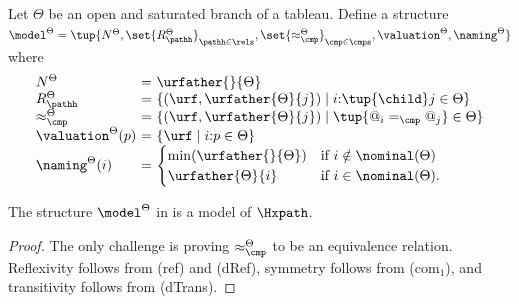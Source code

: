 \begin{defi}\label{def:extmodel}
    Let $\Theta$ be an open and saturated branch of a tableau.
    Define a structure
        $ \model^\Theta =
            \tup{
                N^{\Theta},
                \set{R^{\Theta}_\pathh}_{\pathh \in \rels},
                \set{\approx^{\Theta}_{\cmp}}_{\cmp\in\cmps},
                \valuation^{\Theta},
                \naming^{\Theta}
            }$
    where
    \[
        \begin{array}{l@{\ }c@{\ }l}
            N^{\Theta}              & = & \urfather{}{\Theta} \\
            R^{\Theta}_\pathh       & = & \{(\urf,\urfather{\Theta}{j}) \mid  i{:}\tup{\child}j\in\Theta \} \\
            \approx^{\Theta}_{\cmp} & = & \{(\urf, \urfather{\Theta}{j}) \mid \tup{@_i =_\cmp @_{j}} \in\Theta \}\\            
            \valuation^{\Theta}(p) & = & \{\urf \mid  i{:}p \in \Theta \} \\
            \naming^{\Theta}(i) & = & 
                    \begin{cases}
                        \min(\urfather{}{\Theta}) & \text{if }  i \notin\nominal(\Theta)\\
                        \urfather{\Theta}{i} & \text{if } i\in\nominal(\Theta).
                    \end{cases} 	
        \end{array}
    \]
\end{defi}

\begin{prop}\label{prop:extmodel}
    The structure $\model^{\Theta}$ in  is a model of $\Hxpath$.
\end{prop}
\begin{proof}
    The only challenge is proving $\approx^{\Theta}_{\cmp}$ to be an equivalence relation. 
    Reflexivity follows from (ref) and (dRef), symmetry follows from (com$_1$), and transitivity follows from (dTrans).
\end{proof}

